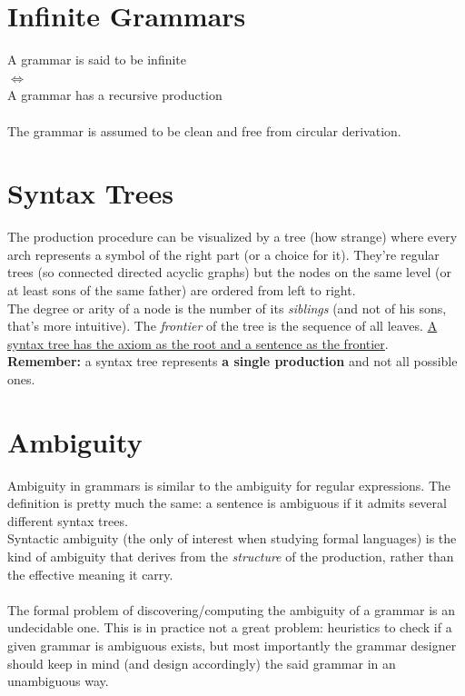     \section{Infinite Grammars}
        A grammar is said to be infinite\\
        $\Leftrightarrow$\\
        A grammar has a recursive production\\\\
        The grammar is assumed to be clean and free from circular derivation. 
       
    \section{Syntax Trees}
    	The production procedure can be visualized by a tree (how strange) where every arch represents a symbol of the right part (or a choice for it). They're regular trees (so connected directed acyclic graphs) but the nodes on the same level (or at least sons of the same father) are ordered from left to right.\\
    	The degree or arity of a node is the number of its \emph{siblings} (and not of his sons, that's more intuitive). The \emph{frontier} of the tree is the sequence of all leaves. \underline{A syntax tree has the axiom as the root and a sentence as the frontier}.\\
    	\textbf{Remember:} a syntax tree represents \textbf{a single production} and not all possible ones.
	
	\section{Ambiguity}
		Ambiguity in grammars is similar to the ambiguity for regular expressions. The definition is pretty much the same: a sentence is ambiguous if it admits several different syntax trees.\\
		Syntactic ambiguity (the only of interest when studying formal languages) is the kind of ambiguity that derives from the \emph{structure} of the production, rather than the effective meaning it carry.\\\\
		The formal problem of discovering/computing the ambiguity of a grammar is an undecidable one. This is in practice not a great problem: heuristics to check if a given grammar is ambiguous exists, but most importantly the grammar designer should keep in mind (and design accordingly) the said grammar in an unambiguous way.
		
